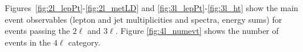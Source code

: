 Figures~\ref{fig:2l_lepPt}-\ref{fig:2l_metLD} and \ref{fig:3l_lepPt}-\ref{fig:3l_ht} show the main event observables (lepton and jet multiplicities and spectra, energy sums) for events passing the $2\ell$ and $3\ell$. Figure \ref{fig:4l_numevt} shows the number of events in the $4\ell$ category.





